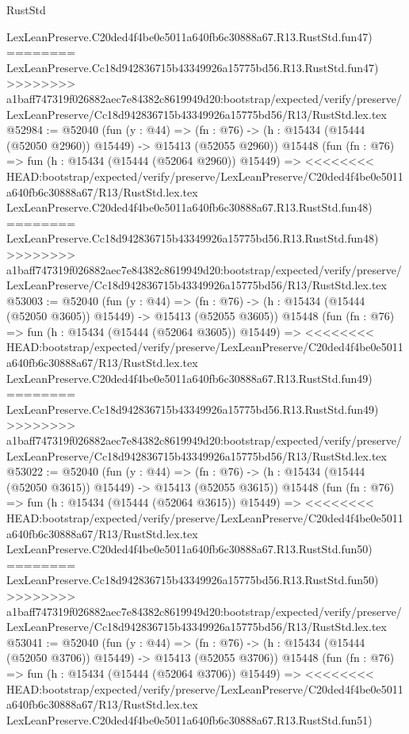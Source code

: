 \begin{lexlean}{RustStd}
\begin{coremodule}
{\begin{coremodule}
{{{{{{{{{{{{{{{{{{{{{{{{{{{{{{{{{{{{{{{{{{{{{{{{{{{{{{{{{{{{    LexLeanPreserve.C20ded4f4be0e5011a640fb6c30888a67.R13.RustStd.fun47)
========
    LexLeanPreserve.Cc18d942836715b43349926a15775bd56.R13.RustStd.fun47)
>>>>>>>> a1baff747319f026882aec7e84382c8619949d20:bootstrap/expected/verify/preserve/LexLeanPreserve/Cc18d942836715b43349926a15775bd56/R13/RustStd.lex.tex
@52984 := @52040
    (fun (y : @44) =>
    (fn : @76) -> (h : @15434 (@15444 (@52050 @2960)) @15449) -> @15413 (@52055 @2960))
    @15448
    (fun (fn : @76) =>
    fun (h : @15434 (@15444 (@52064 @2960)) @15449) =>
<<<<<<<< HEAD:bootstrap/expected/verify/preserve/LexLeanPreserve/C20ded4f4be0e5011a640fb6c30888a67/R13/RustStd.lex.tex
    LexLeanPreserve.C20ded4f4be0e5011a640fb6c30888a67.R13.RustStd.fun48)
========
    LexLeanPreserve.Cc18d942836715b43349926a15775bd56.R13.RustStd.fun48)
>>>>>>>> a1baff747319f026882aec7e84382c8619949d20:bootstrap/expected/verify/preserve/LexLeanPreserve/Cc18d942836715b43349926a15775bd56/R13/RustStd.lex.tex
@53003 := @52040
    (fun (y : @44) =>
    (fn : @76) -> (h : @15434 (@15444 (@52050 @3605)) @15449) -> @15413 (@52055 @3605))
    @15448
    (fun (fn : @76) =>
    fun (h : @15434 (@15444 (@52064 @3605)) @15449) =>
<<<<<<<< HEAD:bootstrap/expected/verify/preserve/LexLeanPreserve/C20ded4f4be0e5011a640fb6c30888a67/R13/RustStd.lex.tex
    LexLeanPreserve.C20ded4f4be0e5011a640fb6c30888a67.R13.RustStd.fun49)
========
    LexLeanPreserve.Cc18d942836715b43349926a15775bd56.R13.RustStd.fun49)
>>>>>>>> a1baff747319f026882aec7e84382c8619949d20:bootstrap/expected/verify/preserve/LexLeanPreserve/Cc18d942836715b43349926a15775bd56/R13/RustStd.lex.tex
@53022 := @52040
    (fun (y : @44) =>
    (fn : @76) -> (h : @15434 (@15444 (@52050 @3615)) @15449) -> @15413 (@52055 @3615))
    @15448
    (fun (fn : @76) =>
    fun (h : @15434 (@15444 (@52064 @3615)) @15449) =>
<<<<<<<< HEAD:bootstrap/expected/verify/preserve/LexLeanPreserve/C20ded4f4be0e5011a640fb6c30888a67/R13/RustStd.lex.tex
    LexLeanPreserve.C20ded4f4be0e5011a640fb6c30888a67.R13.RustStd.fun50)
========
    LexLeanPreserve.Cc18d942836715b43349926a15775bd56.R13.RustStd.fun50)
>>>>>>>> a1baff747319f026882aec7e84382c8619949d20:bootstrap/expected/verify/preserve/LexLeanPreserve/Cc18d942836715b43349926a15775bd56/R13/RustStd.lex.tex
@53041 := @52040
    (fun (y : @44) =>
    (fn : @76) -> (h : @15434 (@15444 (@52050 @3706)) @15449) -> @15413 (@52055 @3706))
    @15448
    (fun (fn : @76) =>
    fun (h : @15434 (@15444 (@52064 @3706)) @15449) =>
<<<<<<<< HEAD:bootstrap/expected/verify/preserve/LexLeanPreserve/C20ded4f4be0e5011a640fb6c30888a67/R13/RustStd.lex.tex
    LexLeanPreserve.C20ded4f4be0e5011a640fb6c30888a67.R13.RustStd.fun51)
}}}}}}}}}}}}}}}}}}}}}}}}}}}}}}}}}}}}}}}}}}}}}}}}}}}}}}}}}}}}
\end{coremodule}}
\end{coremodule}
\end{lexlean}
